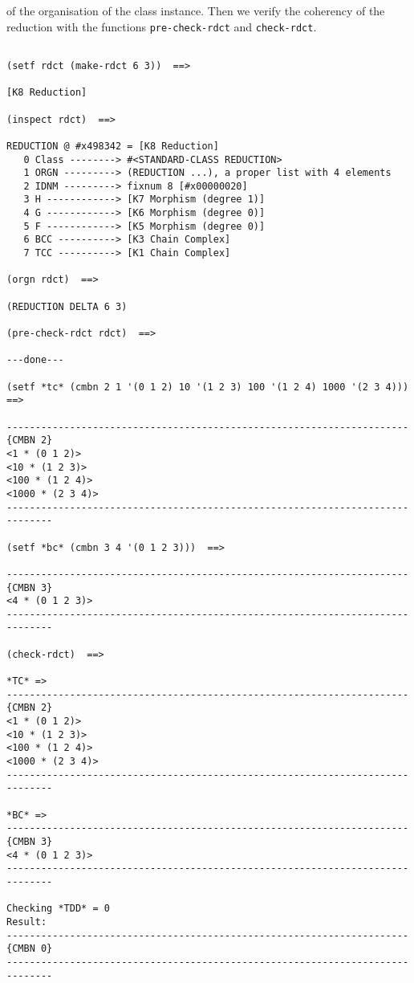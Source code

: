 of the organisation of the class instance. Then we verify the coherency of the reduction with the functions
{\tt pre-check-rdct} and {\tt check-rdct}.
{\footnotesize\begin{verbatim}

(setf rdct (make-rdct 6 3))  ==>

[K8 Reduction]

(inspect rdct)  ==>

REDUCTION @ #x498342 = [K8 Reduction]
   0 Class --------> #<STANDARD-CLASS REDUCTION>
   1 ORGN ---------> (REDUCTION ...), a proper list with 4 elements
   2 IDNM ---------> fixnum 8 [#x00000020]
   3 H ------------> [K7 Morphism (degree 1)]
   4 G ------------> [K6 Morphism (degree 0)]
   5 F ------------> [K5 Morphism (degree 0)]
   6 BCC ----------> [K3 Chain Complex]
   7 TCC ----------> [K1 Chain Complex]

(orgn rdct)  ==>

(REDUCTION DELTA 6 3)

(pre-check-rdct rdct)  ==>

---done---

(setf *tc* (cmbn 2 1 '(0 1 2) 10 '(1 2 3) 100 '(1 2 4) 1000 '(2 3 4)))  ==>

----------------------------------------------------------------------{CMBN 2}
<1 * (0 1 2)>
<10 * (1 2 3)>
<100 * (1 2 4)>
<1000 * (2 3 4)>
------------------------------------------------------------------------------

(setf *bc* (cmbn 3 4 '(0 1 2 3)))  ==>

----------------------------------------------------------------------{CMBN 3}
<4 * (0 1 2 3)>
------------------------------------------------------------------------------

(check-rdct)  ==>

*TC* =>
----------------------------------------------------------------------{CMBN 2}
<1 * (0 1 2)>
<10 * (1 2 3)>
<100 * (1 2 4)>
<1000 * (2 3 4)>
------------------------------------------------------------------------------

*BC* =>
----------------------------------------------------------------------{CMBN 3}
<4 * (0 1 2 3)>
------------------------------------------------------------------------------

Checking *TDD* = 0
Result:
----------------------------------------------------------------------{CMBN 0}
------------------------------------------------------------------------------


\end{verbatim}}
